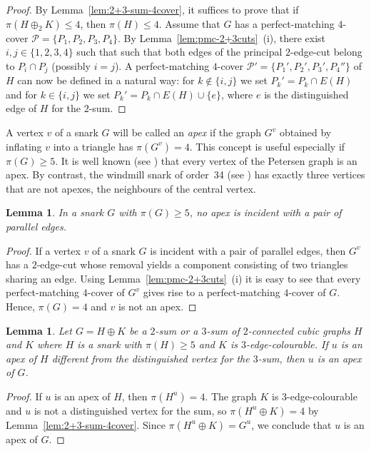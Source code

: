 \documentclass[a4paper]{amsart}
\theoremstyle{plain}
\newtheorem{lemma}[theorem]{Lemma}
\theoremstyle{definition}
\begin{document}
\begin{proof}
By Lemma~\ref{lem:2+3-sum-4cover}, it suffices to prove that if
$\pi(H\oplus_2 K)\leq 4$, then $\pi(H)\leq 4$. Assume that $G$
has a perfect-matching $4$-cover
$\mathcal{P}=\{P_1,P_2,P_3,P_4\}$. By
Lemma~\ref{lem:pmc-2+3cuts}~(i), there exist
$i,j\in\{1,2,3,4\}$ such that such that both edges of the
principal $2$-edge-cut belong to $P_i\cap P_j$ (possibly
$i=j$). A perfect-matching $4$-cover
$\mathcal{P}'=\{P_1',P_2',P_3',P_4''\}$ of $H$ can now be
defined in a natural way: for $k\notin \{i,j\}$ we set
$P_k'=P_k\cap E(H)$ and for $k\in\{i,j\}$ we set $P_k'=P_k\cap
E(H)\cup\{e\}$, where $e$ is the distinguished edge of $H$ for
the $2$-sum.
\end{proof}

A vertex $v$ of a snark $G$ will be called an \emph{apex} if
the graph $G^v$ obtained by inflating $v$ into a triangle has
$\pi(G^v)=4$. This concept is useful especially if $\pi(G)\ge
5$. It is well known (see \cite[p.~146]{EM}) that every vertex
of the Petersen graph is an apex. By contrast, the windmill
snark of order~34 (see \cite[Figure~7]{EM}) has exactly three
vertices that are not apexes, the neighbours of the central
vertex.

\begin{lemma}\label{lem:apex}
In a snark $G$ with $\pi(G)\ge 5$, no apex is incident with a
pair of parallel edges.
\end{lemma}

\begin{proof}
If a vertex $v$ of a snark $G$ is incident with a pair of
parallel edges, then $G^v$ has a $2$-edge-cut whose removal
yields a component consisting of two triangles sharing an edge.
Using Lemma~\ref{lem:pmc-2+3cuts}~(i) it is easy to see that
every perfect-matching $4$-cover of $G^v$ gives rise to a
perfect-matching $4$-cover of $G$. Hence, $\pi(G)=4$ and $v$ is
not an apex.
\end{proof}

\begin{lemma}\label{lem:pmi4sum3gen}
Let $G=H\oplus K$ be a $2$-sum or a $3$-sum of $2$-connected
cubic graphs $H$ and $K$ where $H$ is a snark with $\pi(H)\ge
5$ and $K$ is $3$-edge-colourable. If $u$ is an apex of $H$
different from the distinguished vertex for the $3$-sum, then
$u$ is an apex of $G$.
\end{lemma}

\begin{proof}
If $u$ is an apex of $H$, then $\pi(H^u)=4$. The graph $K$ is
$3$-edge-colourable and $u$ is not a distinguished vertex for
the sum, so $\pi(H^u\oplus K)=4$ by
Lemma~\ref{lem:2+3-sum-4cover}. Since $\pi(H^u\oplus K)=G^u$,
we conclude that $u$ is an apex of $G$.
\end{proof}
\end{document}
